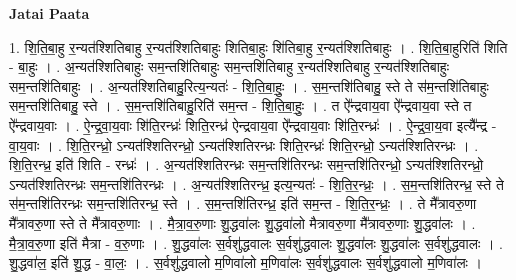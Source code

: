 \documentclass[17pt]{extarticle}
\begin{document}
\textbf{Jatai Paata} \newline

1. शि॒ति॒बा॒हु र॒न्यत॑श्शितिबाहु र॒न्यत॑श्शितिबाहुः शितिबा॒हुः शि॑तिबा॒हु र॒न्यत॑श्शितिबाहुः । . शि॒ति॒बा॒हुरिति॑ शिति - बा॒हुः । . अ॒न्यत॑श्शितिबाहुः सम॒न्तशि॑तिबाहुः सम॒न्तशि॑तिबाहु र॒न्यत॑श्शितिबाहु र॒न्यत॑श्शितिबाहुः सम॒न्तशि॑तिबाहुः । . अ॒न्यत॑श्शितिबाहु॒रित्य॒न्यतः॑ - शि॒ति॒बा॒हुः॒ । . स॒म॒न्तशि॑तिबाहु॒ स्ते ते स॑म॒न्तशि॑तिबाहुः सम॒न्तशि॑तिबाहु॒ स्ते । . स॒म॒न्तशि॑तिबाहु॒रिति॑ सम॒न्त - शि॒ति॒बा॒हुः॒ । . त ऐ᳚न्द्रवाय॒वा ऐ᳚न्द्रवाय॒वा स्ते त ऐ᳚न्द्रवाय॒वाः । . ऐ॒न्द्र॒वा॒य॒वाः शि॑ति॒रन्ध्रः॑ शिति॒रन्ध्र॑ ऐन्द्रवाय॒वा ऐ᳚न्द्रवाय॒वाः शि॑ति॒रन्ध्रः॑ । . ऐ॒न्द्र॒वा॒य॒वा इत्यै᳚न्द्र - वा॒य॒वाः । . शि॒ति॒रन्ध्रो॒ ऽन्यत॑श्शितिरन्ध्रो॒ ऽन्यत॑श्शितिरन्ध्रः शिति॒रन्ध्रः॑ शिति॒रन्ध्रो॒ ऽन्यत॑श्शितिरन्ध्रः । . शि॒ति॒रन्ध्र॒ इति॑ शिति - रन्ध्रः॑ । . अ॒न्यत॑श्शितिरन्ध्रः सम॒न्तशि॑तिरन्ध्रः सम॒न्तशि॑तिरन्ध्रो॒ ऽन्यत॑श्शितिरन्ध्रो॒ ऽन्यत॑श्शितिरन्ध्रः सम॒न्तशि॑तिरन्ध्रः । . अ॒न्यत॑श्शितिरन्ध्र॒ इत्य॒न्यतः॑ - शि॒ति॒र॒न्ध्रः॒ । . स॒म॒न्तशि॑तिरन्ध्र॒ स्ते ते स॑म॒न्तशि॑तिरन्ध्रः सम॒न्तशि॑तिरन्ध्र॒ स्ते । . स॒म॒न्तशि॑तिरन्ध्र॒ इति॑ सम॒न्त - शि॒ति॒र॒न्ध्रः॒ । . ते मै᳚त्रावरु॒णा मै᳚त्रावरु॒णा स्ते ते मै᳚त्रावरु॒णाः । . मै॒त्रा॒व॒रु॒णाः शु॒द्धवा॑लः शु॒द्धवा॑लो मैत्रावरु॒णा मै᳚त्रावरु॒णाः शु॒द्धवा॑लः । . मै॒त्रा॒व॒रु॒णा इति॑ मैत्रा - व॒रु॒णाः । . शु॒द्धवा॑लः स॒र्वशु॑द्धवालः स॒र्वशु॑द्धवालः शु॒द्धवा॑लः शु॒द्धवा॑लः स॒र्वशु॑द्धवालः । . शु॒द्धवा॑ल॒ इति॑ शु॒द्ध - वा॒लः॒ । . स॒र्वशु॑द्धवालो म॒णिवा॑लो म॒णिवा॑लः स॒र्वशु॑द्धवालः स॒र्वशु॑द्धवालो म॒णिवा॑लः । \newline
\end{document}
